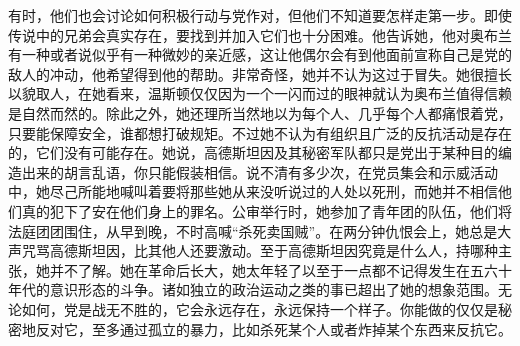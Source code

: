 \begin{paracol}{2}
有时，他们也会讨论如何积极行动与党作对，但他们不知道要怎样走第一步。即使传说中的兄弟会真实存在，要找到并加入它们也十分困难。他告诉她，他对奥布兰有一种或者说似乎有一种微妙的亲近感，这让他偶尔会有到他面前宣称自己是党的敌人的冲动，他希望得到他的帮助。非常奇怪，她并不认为这过于冒失。她很擅长以貌取人，在她看来，温斯顿仅仅因为一个一闪而过的眼神就认为奥布兰值得信赖是自然而然的。除此之外，她还理所当然地以为每个人、几乎每个人都痛恨着党，只要能保障安全，谁都想打破规矩。不过她不认为有组织且广泛的反抗活动是存在的，它们没有可能存在。她说，高德斯坦因及其秘密军队都只是党出于某种目的编造出来的胡言乱语，你只能假装相信。说不清有多少次，在党员集会和示威活动中，她尽己所能地喊叫着要将那些她从来没听说过的人处以死刑，而她并不相信他们真的犯下了安在他们身上的罪名。公审举行时，她参加了青年团的队伍，他们将法庭团团围住，从早到晚，不时高喊``杀死卖国贼''。在两分钟仇恨会上，她总是大声咒骂高德斯坦因，比其他人还要激动。至于高德斯坦因究竟是什么人，持哪种主张，她并不了解。她在革命后长大，她太年轻了以至于一点都不记得发生在五六十年代的意识形态的斗争。诸如独立的政治运动之类的事已超出了她的想象范围。无论如何，党是战无不胜的，它会永远存在，永远保持一个样子。你能做的仅仅是秘密地反对它，至多通过孤立的暴力，比如杀死某个人或者炸掉某个东西来反抗它。

\switchcolumn*


\end{paracol}
